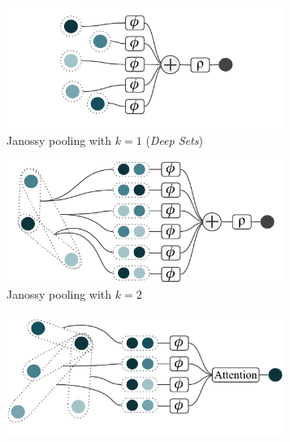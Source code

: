 \begin{figure}[th]
	\centering
	\begin{subfigure}[h]{0.46\textwidth}
		\centering
		\captionsetup{justification=centering}
		\includegraphics[width=0.99\textwidth]{chapters/assets/graph-figs/Janossy_K1.pdf}
		\caption{Janossy pooling with $k=1$ (\emph{Deep Sets})}
		\label{fig:Janossy_K1}
	\end{subfigure} 
	\begin{subfigure}[h]{0.46\textwidth}
		\centering
		\captionsetup{justification=centering}
		\includegraphics[width=0.99\textwidth]{chapters/assets/graph-figs/Janossy_K2.pdf}
		\caption{Janossy pooling with $k=2$}
		\label{fig:Janossy_K2}
	\end{subfigure} 
	\begin{subfigure}[h]{0.46\textwidth}
	    \vspace{+1cm}
		\centering
		\captionsetup{justification=centering}
		\includegraphics[width=0.99\textwidth]{chapters/assets/graph-figs/Janossy_K2Att.pdf}

\end{subfigure}
\end{figure}
